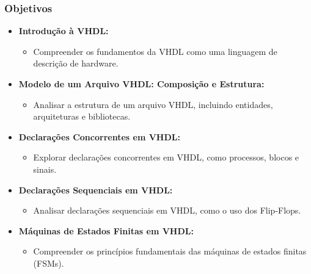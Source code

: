\documentclass[aspectratio=169]{beamer}
\begin{document}
\begin{frame}
	\frametitle{Objetivos}
	
	\begin{itemize}
		\justifying
		\item \textbf{Introdução à VHDL:}
		\begin{itemize}
			\justifying
			\item Compreender os fundamentos da VHDL como uma linguagem de descrição de hardware.
		\end{itemize}
		
		\item \textbf{Modelo de um Arquivo VHDL: Composição e Estrutura:}
		\begin{itemize}
			\justifying
			\item Analisar a estrutura de um arquivo VHDL, incluindo entidades, arquiteturas e bibliotecas.
		\end{itemize}
		
		\item \textbf{Declarações Concorrentes em VHDL:}
		\begin{itemize}
			\justifying
			\item Explorar declarações concorrentes em VHDL, como processos, blocos e sinais.
		\end{itemize}
		
		\item \textbf{Declarações Sequenciais em VHDL:}
		\begin{itemize}
			\justifying
			\item Analisar declarações sequenciais em VHDL, como o uso dos Flip-Flops.
		\end{itemize}
		
		\item \textbf{Máquinas de Estados Finitas em VHDL:}
		\begin{itemize}
			\justifying
			\item Compreender os princípios fundamentais das máquinas de estados finitas (FSMs).
		\end{itemize}	
		
	\end{itemize}
\end{frame}
\end{document}
